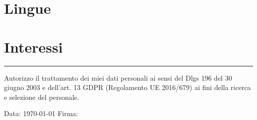\documentclass[11pt,a4paper,sans]{moderncv} %
\begin{document}
\vspace{0.5cm}



\section{Lingue}



\section{Interessi}

\renewcommand{\listitemsymbol}{-~} %



\vfill

\noindent\rule{5cm}{1pt}

Autorizzo il trattamento dei miei dati personali ai sensi del Dlgs 196 del
30 giugno 2003 e dell’art. 13 GDPR (Regolamento UE 2016/679) ai
fini della ricerca e selezione del personale.

\vspace{1cm}

Data: \today \hspace{5cm} Firma:

\vspace{1cm}
\end{document}
